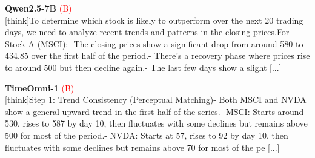 \noindent
\begin{minipage}[t]{0.28\textwidth}
\colorbox{red!8}{\parbox{\dimexpr\textwidth-2\fboxsep}{
\textbf{Qwen2.5-7B} \textcolor{red}{(B)} \\[2pt]
\tiny
[think]\newline To determine which stock is likely to outperform over the next 20 trading days, we need to analyze recent trends and patterns in the closing prices.\newline For Stock A (MSCI):\newline - The closing prices show a significant drop from around 580 to 434.85 over the first half of the period.\newline - There's a recovery phase where prices rise to around 500 but then decline again.\newline - The last few days show a slight  [...]
}}
\end{minipage}
\hfill
\begin{minipage}[t]{0.28\textwidth}
\colorbox{red!8}{\parbox{\dimexpr\textwidth-2\fboxsep}{
\textbf{TimeOmni-1} \textcolor{red}{(B)} \\[2pt]
\tiny
[think]\newline Step 1: Trend Consistency (Perceptual Matching)\newline - Both MSCI and NVDA show a general upward trend in the first half of the series.\newline     - MSCI: Starts around 530, rises to  587 by day 10, then fluctuates with some declines but remains above 500 for most of the period.\newline     - NVDA: Starts at  57, rises to  92 by day 10, then fluctuates with some declines but remains above 70 for most of the pe [...]
}}
\end{minipage}
\hfill
